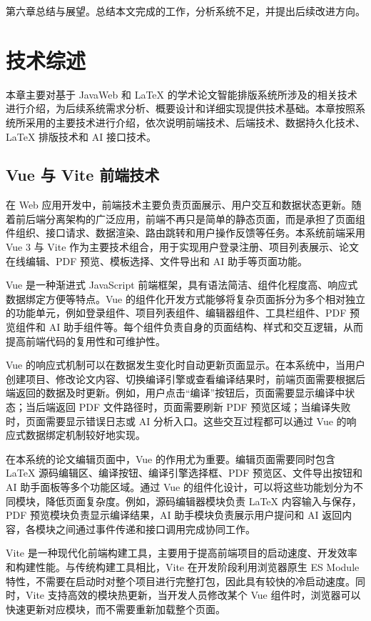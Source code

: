 \documentclass{xduugthesis}
\begin{document}
第六章总结与展望。总结本文完成的工作，分析系统不足，并提出后续改进方向。

\chapter{技术综述}
本章主要对基于 JavaWeb 和 LaTeX 的学术论文智能排版系统所涉及的相关技术进行介绍，为后续系统需求分析、概要设计和详细实现提供技术基础。本章按照系统所采用的主要技术进行介绍，依次说明前端技术、后端技术、数据持久化技术、LaTeX 排版技术和 AI 接口技术。

\section{Vue 与 Vite 前端技术}
在 Web 应用开发中，前端技术主要负责页面展示、用户交互和数据状态更新。随着前后端分离架构的广泛应用，前端不再只是简单的静态页面，而是承担了页面组件组织、接口请求、数据渲染、路由跳转和用户操作反馈等任务。本系统前端采用 Vue 3 与 Vite 作为主要技术组合，用于实现用户登录注册、项目列表展示、论文在线编辑、PDF 预览、模板选择、文件导出和 AI 助手等页面功能。

Vue 是一种渐进式 JavaScript 前端框架，具有语法简洁、组件化程度高、响应式数据绑定方便等特点。Vue 的组件化开发方式能够将复杂页面拆分为多个相对独立的功能单元，例如登录组件、项目列表组件、编辑器组件、工具栏组件、PDF 预览组件和 AI 助手组件等。每个组件负责自身的页面结构、样式和交互逻辑，从而提高前端代码的复用性和可维护性。

Vue 的响应式机制可以在数据发生变化时自动更新页面显示。在本系统中，当用户创建项目、修改论文内容、切换编译引擎或查看编译结果时，前端页面需要根据后端返回的数据及时更新。例如，用户点击“编译”按钮后，页面需要显示编译中状态；当后端返回 PDF 文件路径时，页面需要刷新 PDF 预览区域；当编译失败时，页面需要显示错误日志或 AI 分析入口。这些交互过程都可以通过 Vue 的响应式数据绑定机制较好地实现。

在本系统的论文编辑页面中，Vue 的作用尤为重要。编辑页面需要同时包含 LaTeX 源码编辑区、编译按钮、编译引擎选择框、PDF 预览区、文件导出按钮和 AI 助手面板等多个功能区域。通过 Vue 的组件化设计，可以将这些功能划分为不同模块，降低页面复杂度。例如，源码编辑器模块负责 LaTeX 内容输入与保存，PDF 预览模块负责显示编译结果，AI 助手模块负责展示用户提问和 AI 返回内容，各模块之间通过事件传递和接口调用完成协同工作。

Vite 是一种现代化前端构建工具，主要用于提高前端项目的启动速度、开发效率和构建性能。与传统构建工具相比，Vite 在开发阶段利用浏览器原生 ES Module 特性，不需要在启动时对整个项目进行完整打包，因此具有较快的冷启动速度。同时，Vite 支持高效的模块热更新，当开发人员修改某个 Vue 组件时，浏览器可以快速更新对应模块，而不需要重新加载整个页面。
\end{document}
